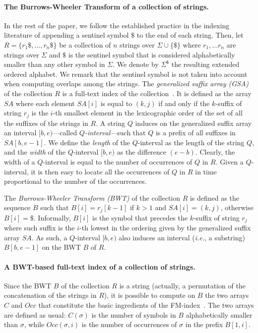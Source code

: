 \documentclass[runningheads,envcountsame,a4paper]{llncs}
\newcommand{\ie}{\textit{i.e.}\xspace}
\newcommand{\SA}{\ensuremath{\textit{SA}}}
\newcommand{\Occ}{\ensuremath{\textit{Occ}}}
\begin{document}
\paragraph{The Burrows-Wheeler Transform of a collection of strings.}
In the rest of the paper, we follow the established practice in the
indexing literature of appending a sentinel symbol $\$$ to the end of
each string.
Then, let $R = \{r_1\$, \dots, r_n\$ \}$ be a collection of $n$ strings
over $\Sigma \cup \{ \$ \}$ where $r_1, \dots r_n$ are strings over
$\Sigma$ and $\$$ is the sentinel symbol that is considered
alphabetically smaller than any other symbol in $\Sigma$.
We denote by $\Sigma^\$$ the resulting extended ordered alphabet.
We remark that the sentinel symbol is not taken into account when
computing overlaps among the strings.
The \emph{generalized suffix array (GSA)} of the collection $R$ is a
full-text index of the collection~\cite{Shi1996}.
It is defined as the array $\SA$ where each element $\SA[i]$ is
equal to $(k, j)$ if and only if the $k$-suffix of string $r_{j}$ is the
$i$-th smallest element in the lexicographic order of the set of all the
suffixes of the strings in $R$.
A string $Q$ induces on the generalized suffix array an interval $[b,
e)$---called \emph{$Q$-interval}---such that $Q$ is a prefix of all
suffixes in $\SA[b, e-1]$.
We define the \emph{length} of the $Q$-interval as the length of the
string $Q$, and the \emph{width} of the $Q$-interval $[b, e)$ as the
difference $(e-b)$.
Clearly, the width of a $Q$-interval is equal to the number of
occurrences of $Q$ in $R$.
Given a $Q$-interval, it is then easy to locate all the occurrences of
$Q$ in $R$ in time proportional to the number of the occurrences.

The \emph{Burrows-Wheeler Transform (BWT)} of the collection $R$ is
defined as the sequence $B$ such that $B[i]=r_{j}[k -1]$ if $k > 1$
and $\SA[i] = (k,j)$, otherwise $B[i]= \$$.
Informally, $B[i]$ is the symbol that precedes the $k$-suffix of
string $r_j$ where such suffix is the $i$-th lowest in the ordering
given by the generalized suffix array $\SA$.
As such, a $Q$-interval $[b, e)$ also induces an interval (\ie, a
substring) $B[b, e-1]$ on the BWT $B$ of $R$.

\paragraph{A BWT-based full-text index of a collection of strings.}
Since the BWT $B$ of the collection $R$ is a string (actually, a
permutation of the concatenation of the strings in $R$), it is possible
to compute on $B$ the two arrays $C$ and $\Occ$ that constitute the
basic ingredients of the FM-index~\cite{Ferragina2005}.
The two arrays are defined as usual: $C(\sigma)$ is the number of
symbols in $B$ alphabetically smaller than $\sigma$, while $\Occ(\sigma,
i)$ is the number of occurrences of $\sigma$ in the prefix $B[1, i]$.
\end{document}
